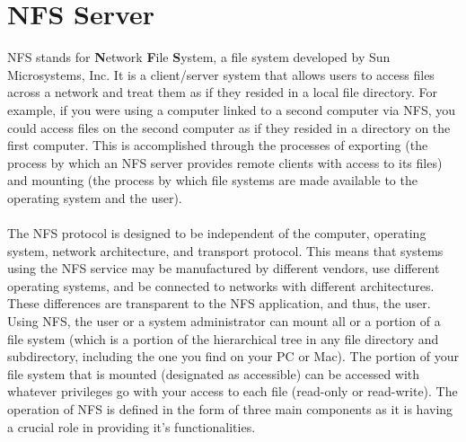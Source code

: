 \documentclass[12pt]{report}
\begin{document}
\section{NFS Server}
\hspace{6mm} NFS stands for \textbf{N}etwork \textbf{F}ile \textbf{S}ystem, a file system developed by Sun Microsystems, Inc. It is a client/server system that allows users to access files across a network and treat them as if they resided in a local file directory. For example, if you were using a computer linked to a second computer via NFS, you could access files on the second computer as if they resided in a directory on the first computer. This is accomplished through the processes of exporting (the process by which an NFS server provides remote clients with access to its files) and mounting (the process by which file systems are made available to the operating system and the user).\\
\\
The NFS protocol is designed to be independent of the computer, operating system, network architecture, and transport protocol. This means that systems using the NFS service may be manufactured by different vendors, use different operating systems, and be connected to networks with different architectures. These differences are transparent to the NFS application, and thus, the user.
\\
Using NFS, the user or a system administrator can mount all or a portion of a file system (which is a portion of the hierarchical tree in any file directory and subdirectory, including the one you find on your PC or Mac). The portion of your file system that is mounted (designated as accessible) can be accessed with whatever privileges go with your access to each file (read-only or read-write). The operation of NFS is defined in the form of three main components as it is having a crucial role in providing it’s functionalities.
\end{document}
